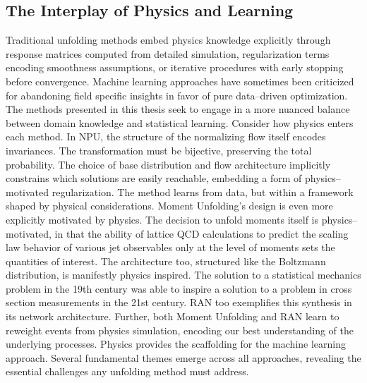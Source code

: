     \subsection{The Interplay of Physics and Learning}
        Traditional unfolding methods embed physics knowledge explicitly through response matrices computed from detailed simulation, regularization terms encoding smoothness assumptions, or iterative procedures with early stopping before convergence.
        Machine learning approaches have sometimes been criticized for abandoning field specific insights in favor of pure data--driven optimization.
        The methods presented in this thesis seek to engage in a more nuanced balance between domain knowledge and statistical learning.
        Consider how physics enters each method. In NPU, the structure of the normalizing flow itself encodes invariances. The transformation must be bijective, preserving the total probability. The choice of base distribution and flow architecture implicitly constrains which solutions are easily reachable, embedding a form of physics--motivated regularization.
        The method learns from data, but within a framework shaped by physical considerations.
        Moment Unfolding's design is even more explicitly motivated by physics.
        The decision to unfold moments itself is physics--motivated, in that the ability of lattice QCD calculations to predict the scaling law behavior of various jet observables only at the level of moments sets the quantities of interest.
        The architecture too, structured like the Boltzmann distribution, is manifestly physics inspired.
        The solution to a statistical mechanics problem in the 19th century was able to inspire a solution to a problem in cross section measurements in the 21st century.
        RAN too exemplifies this synthesis in its network architecture.
        Further, both Moment Unfolding and RAN learn to reweight events from physics simulation, encoding our best understanding of the underlying processes.
        Physics provides the scaffolding for the machine learning approach.
        Several fundamental themes emerge across all approaches, revealing the essential challenges any unfolding method must address.
    
